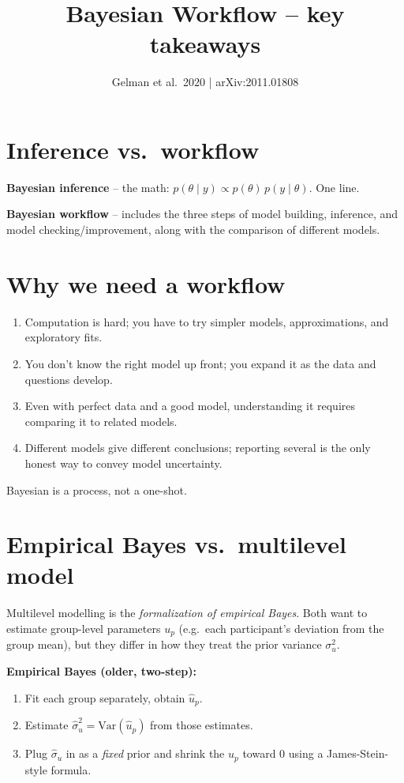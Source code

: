 \documentclass[11pt,a4paper]{article}
\title{Bayesian Workflow -- key takeaways}
\author{Gelman et al.\ 2020 \;|\; arXiv:2011.01808}
\date{}
\begin{document}
\maketitle

\section*{Inference vs.\ workflow}

\textbf{Bayesian inference} -- the math:
$p(\theta\mid y) \propto p(\theta)\,p(y\mid\theta)$. One line.

\textbf{Bayesian workflow} -- includes the three steps of
model building, inference, and model checking/improvement,
along with the comparison of different models.

\section*{Why we need a workflow}

\begin{enumerate}
    \item Computation is hard; you have to try simpler models,
          approximations, and exploratory fits.
    \item You don't know the right model up front; you expand it as
          the data and questions develop.
    \item Even with perfect data and a good model, understanding it
          requires comparing it to related models.
    \item Different models give different conclusions; reporting
          several is the only honest way to convey model uncertainty.
\end{enumerate}

\noindent Bayesian is a process, not a one-shot.

\section*{Empirical Bayes vs.\ multilevel model}

Multilevel modelling is the \emph{formalization of empirical Bayes}.
Both want to estimate group-level parameters $u_p$ (e.g.\ each
participant's deviation from the group mean), but they differ in how
they treat the prior variance $\sigma_u^2$.

\textbf{Empirical Bayes (older, two-step):}
\begin{enumerate}
    \item Fit each group separately, obtain $\hat u_p$.
    \item Estimate $\hat\sigma_u^2 = \mathrm{Var}(\hat u_p)$ from those
          estimates.
    \item Plug $\hat\sigma_u$ in as a \emph{fixed} prior and shrink the
          $\hat u_p$ toward $0$ using a James-Stein-style formula.
\end{enumerate}
\end{document}
